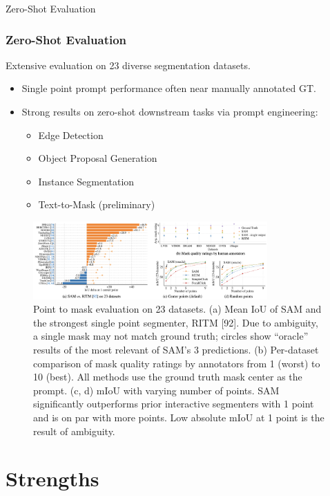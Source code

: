 \documentclass{beamer}
\begin{document}
\begin{frame}{Zero-Shot Evaluation}
    \frametitle{Zero-Shot Evaluation}
    Extensive evaluation on 23 diverse segmentation datasets.
    \begin{itemize}
        \item Single point prompt performance often near manually annotated GT.
        \item Strong results on zero-shot downstream tasks via prompt engineering:
        \begin{itemize}
            \item Edge Detection
            \item Object Proposal Generation
            \item Instance Segmentation
            \item Text-to-Mask (preliminary)
        \end{itemize}
    \end{itemize}
    \vfill
    \begin{figure}
        \centering
        \includegraphics[width=0.8\textwidth]{figures/zero_shot_performance.png}
        \caption{\tiny Point to mask evaluation on 23 datasets. (a) Mean IoU of SAM and the strongest single point segmenter, RITM [92].
        Due to ambiguity, a single mask may not match ground truth; circles show “oracle” results of the most relevant of SAM's 3
        predictions. (b) Per-dataset comparison of mask quality ratings by annotators from 1 (worst) to 10 (best). All methods use
        the ground truth mask center as the prompt. (c, d) mIoU with varying number of points. SAM signiﬁcantly outperforms prior
        interactive segmenters with 1 point and is on par with more points. Low absolute mIoU at 1 point is the result of ambiguity.}
        \label{fig:zero_shot_performance}
    \end{figure}
\end{frame}

\section{Strengths}
\end{document}
